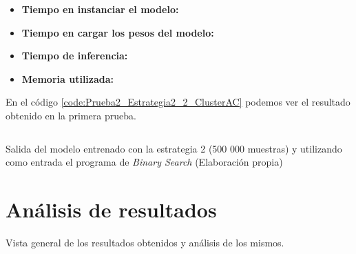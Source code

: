 \begin{itemize}
    \item \textbf{Tiempo en instanciar el modelo:}
    \item \textbf{Tiempo en cargar los pesos del modelo:}
    \item \textbf{Tiempo de inferencia:}
    \item \textbf{Memoria utilizada:}
\end{itemize}

En el código \ref{code:Prueba2_Estrategia2_2_ClusterAC} podemos ver el resultado obtenido
en la primera prueba.

\begin{mycode}
    \begin{verbatim}

    \end{verbatim}
    \caption[Salida del modelo entrenado con la estrategia 2 (500 000 muestras) y utilizando como entrada el programa de \textit{Binary Search}]{Salida del modelo entrenado con la estrategia 2 (500 000 muestras) y utilizando como entrada el programa de \textit{Binary Search} (Elaboración propia)}
    \label{code:Prueba2_Estrategia2_2_ClusterAC}
\end{mycode}

\section{Análisis de resultados}
\label{sec:analisis_resultados}

Vista general de los resultados obtenidos y análisis de los mismos.